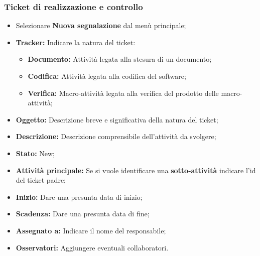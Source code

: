       \subsubsection{Ticket di realizzazione e controllo}
        \begin{itemize}
          \item Selezionare \textbf{Nuova segnalazione} dal menù principale;
          \item \textbf{Tracker: }Indicare la natura del ticket:
          \bgroup
            \begin{itemize}
              \item \textbf{Documento: }Attività legata alla stesura di un documento;
              \item \textbf{Codifica: }Attività legata alla  codifica del software;
              \item \textbf{Verifica: }Macro-attività legata alla verifica del prodotto delle macro-attività;
            \end{itemize}
          \egroup
            \item \textbf{Oggetto: }Descrizione breve e significativa della natura del ticket;
          \item \textbf{Descrizione: }Descrizione comprensibile dell'attività da svolgere;
          \item \textbf{Stato: }New;
          \item \textbf{Attività principale: }Se si vuole identificare una \textbf{sotto-attività} indicare l'id del ticket padre;
          \item \textbf{Inizio: }Dare una presunta data di inizio;
          \item \textbf{Scadenza: }Dare una presunta data di fine;
          \item \textbf{Assegnato a: }Indicare il nome del responsabile;
          \item \textbf{Osservatori: }Aggiungere eventuali collaboratori.
        \end{itemize}
